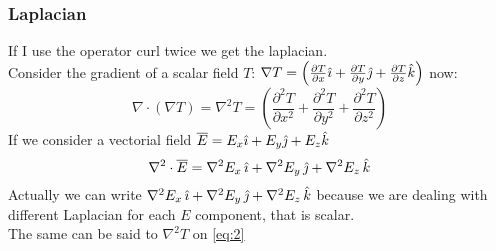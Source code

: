 \subsubsection*{Laplacian}\label{sec:laplacian}
If I use the operator curl twice we get the laplacian.\\
Consider the gradient of a scalar field $T$: $\nabla T=\left(\frac{\partial T}{\partial x}\hat{\imath}+\frac{\partial T}{\partial y}\hat{\jmath}+\frac{\partial T}{\partial z}\hat{\mathnormal{k}}\right)$ now:
\begin{equation}\label{eq:2}
\nabla\cdot(\nabla T)=\nabla^2T=\left(\frac{\partial^2 T}{\partial x^2}+\frac{\partial^2 T}{\partial y^2}+\frac{\partial^2 T}{\partial z^2}\right)
\end{equation}
If we consider a vectorial field $\overline{E}=E_x \hat{\imath} + E_y \hat{\jmath} + E_z \hat{\mathnormal{k}}$
\begin{equation}
\nabla^2\cdot \overline{E}= \nabla^2E_x\,\hat{\imath}+\nabla^2E_y\,\hat{\jmath}+\nabla^2E_z\,\hat{\mathnormal{k}}
\end{equation}
Actually we can write $\nabla^2E_x\,\hat{\imath}+\nabla^2E_y\,\hat{\jmath}+\nabla^2E_z\,\hat{\mathnormal{k}}$ because we are dealing with different Laplacian for each $E$ component, that is scalar.\\
The same can be said to $\nabla^2 T$ on \cref{eq:2}
